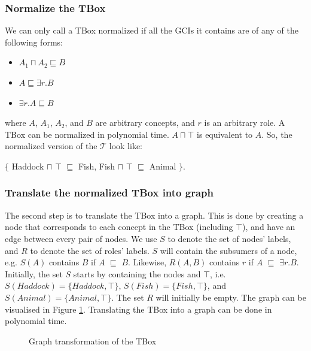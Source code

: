 \subsubsection{Normalize the TBox}
We can only call a TBox normalized if all the GCIs it contains are of any of the following forms:
\begin{itemize}
\item $A_1 \sqcap A_2 \sqsubseteq B$
\item $A \sqsubseteq \exists r.B$
\item $\exists r.A \sqsubseteq B$
\end{itemize}
where $A$, $A_1$, $A_2$, and $B$ are arbitrary concepts, and $r$ is an arbitrary role. A TBox can be normalized in polynomial time. $A \sqcap \top$ is equivalent to $A$. So, the normalized version of the $\mathcal{T}$ look like:
\begin{center}
$\lbrace$ Haddock $\sqcap$ $\top$ $\sqsubseteq$ Fish, Fish $\sqcap$ $\top$ $\sqsubseteq$ Animal $\rbrace$.
\end{center}

\subsubsection{Translate the normalized TBox into graph}
The second step is to translate the TBox into a graph. This is done by creating a node that corresponds to each concept in the TBox (including $\top$), and have an edge between every pair of nodes. We use $S$ to denote the set of nodes' labels, and $R$ to denote the set of roles' labels. $S$ will contain the subsumers of a node, e.g. $S(A)$ contains $B$ if $A$ $\sqsubseteq$ $B$. Likewise, $R(A, B)$ contains $r$ if $A$ $\sqsubseteq$ $\exists r.B$. Initially, the set $S$ starts by containing the nodes and $\top$, i.e. $S(Haddock)= \lbrace Haddock, \top \rbrace$, $S(Fish) = \lbrace Fish, \top \rbrace$, and $S(Animal)= \lbrace Animal , \top \rbrace$. The set $R$ will initially be empty. The graph can be visualised in Figure \ref{hdk}. Translating the TBox into a graph can be done in polynomial time.

\begin{figure}
\centering
{}
\caption{Graph transformation of the TBox}
\label{hdk}
\end{figure}


